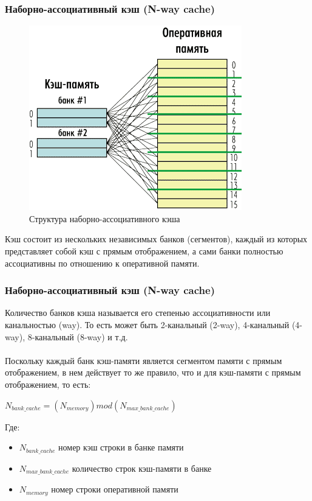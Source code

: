 \documentclass{beamer}
\begin{document}

\begin{frame}
\frametitle{Наборно-ассоциативный кэш (N-way cache)}

\begin{figure}
\includegraphics[scale=0.5]{Pic_5}
\caption{Структура наборно-ассоциативного кэша}
\end{figure}

Кэш состоит из нескольких независимых банков (сегментов), каждый из которых представляет собой кэш с прямым отображением, а сами банки полностью ассоциативны по отношению к оперативной памяти.

\end{frame}


\begin{frame}
\frametitle{Наборно-ассоциативный кэш (N-way cache)}

Количество банков кэша называется его степенью ассоциативности или канальностью (way). То есть может быть 2-канальный (2-way), 4-канальный (4-way), 8-канальный (8-way) и т.д.\\~\\

Поскольку каждый банк кэш-памяти является сегментом памяти с прямым отображением, в нем действует то же правило, что и для кэш-памяти с прямым отображением, то есть:

\begin{center}
$N_{bank\_cache} = (N_{memory})mod(N_{max\_bank\_cache})$
\end{center}

Где:
\begin{itemize}
\item $N_{bank\_cache}$ номер кэш строки в банке памяти
\item $N_{max\_bank\_cache}$ количество строк кэш-памяти в банке
\item $N_{memory}$ номер строки оперативной памяти
\end{itemize}

\end{frame}
\end{document}
